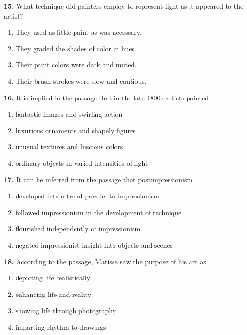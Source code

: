 \documentclass[12pt]{article}
\begin{document}
\vspace{0.25\baselineskip}
\noindent\textbf{15.} What technique did painters employ to represent light as it appeared to the artist?
\begin{enumerate}[label=(\Alph*),leftmargin=*,itemsep=0.2em]
\item They used as little paint as was necessary.
\item They graded the shades of color in hues.
\item Their paint colors were dark and muted.
\item Their brush strokes were slow and cautious.
\end{enumerate}
\par
\vspace{0.25\baselineskip}
\noindent\textbf{16.} It is implied in the passage that in the late 1800s artists painted
\begin{enumerate}[label=(\Alph*),leftmargin=*,itemsep=0.2em]
\item fantastic images and swirling action
\item luxurious ornaments and shapely figures
\item unusual textures and luscious colors
\item ordinary objects in varied intensities of light
\end{enumerate}
\par
\vspace{0.25\baselineskip}
\noindent\textbf{17.} It can be inferred from the passage that postimpressionism
\begin{enumerate}[label=(\Alph*),leftmargin=*,itemsep=0.2em]
\item developed into a trend parallel to impressionism
\item followed impressionism in the development of technique
\item flourished independently of impressionism
\item negated impressionist insight into objects and scenes
\end{enumerate}
\par
\vspace{0.25\baselineskip}
\noindent\textbf{18.} According to the passage, Matisse saw the purpose of his art as
\begin{enumerate}[label=(\Alph*),leftmargin=*,itemsep=0.2em]
\item depicting life realistically
\item enhancing life and reality
\item showing life through photography
\item imparting rhythm to drawings
\end{enumerate}
\par
\vspace{0.25\baselineskip}
\end{document}
